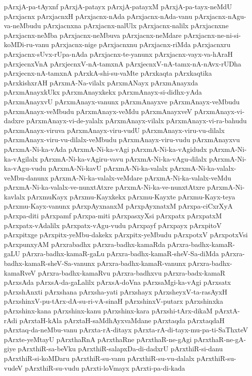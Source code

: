 {pArxjA-pa-tAyxnf
pArxjA-patayx
pArxjA-patayxM
pArxjA-pa-tayx-neMdU
pArxjacnx
pArxjacnxH
pArxjacnx-nAda
pArxjacnx-nAda-vanu
pArxjacnx-nAgu-va-neMbudu
pArxjacnxna
pArxjacnx-nalUlx
pArxjacnx-nalilx
pArxjacnxne
pArxjacnx-neMba
pArxjacnx-neMbuva
pArxjacnx-neMdare
pArxjacnx-ne-ni-si-koMDi-ru-vanu
pArxjacnx-nige
pArxjacnxnu
pArxjacnx-riMda
pArxjacnxru
pArxjacnx-sUvx-rUpa-nAda
pArxjacnx-te-yanunx
pArxjacnx-vayx-va-hAraH
pArxjecnxVnA
pArxjecnxV-nA-tamxnA
pArxjecnxV-nA-tamx-nA-nAvx-rUDha
pArxjecnx-nA-tamxnA
pArxkA-shi-su-vaMte
pArxkaqta
pArxkaqtika
pArxkishxrAH
pArxmA-Na-vilalx
pArxmANayx
pArxmAnayxda
pArxmAnayxkUkx
pArxmAnayxkekx
pArxmAnayx-si-didhx-yAda
pArxmAnayxvU
pArxmAnayx-vanunx
pArxmAnayxve
pArxmAnayx-veMbudu
pArxmAnayx-veMbudu
pArxmAnayx-veMdu
pArxmAnayxveV
pArxmAnayx-vi-dadxre
pArxmAnayx-vi-de-yalalx
pArxmAnayx-vilalx
pArxmAnayx-vi-ra-bahudu
pArxmAnayx-viruva
pArxmAnayx-viru-vudU
pArxmAnayx-viru-vu-dilalx
pArxmAnayx-viru-vu-dilalx-veMbudu
pArxmAnayx-viru-vudu
pArxmAnayxvu
pArxmA-Ni-ka-vAda
pArxmA-Ni-ka-vAgi
pArxmA-Ni-ka-vAgidudx
pArxmA-Ni-ka-vAgilalx
pArxmA-Ni-ka-vAgiru-vavu
pArxmA-Ni-ka-vAgu-dilalx
pArxmA-Ni-ka-vAgu-vudu
pArxmA-Ni-kavU
pArxmA-Ni-ka-valalx
pArxmA-Ni-ka-valalx-veMbu-danunx
pArxmA-Ni-ka-valalx-veMdare
pArxmA-Ni-ka-valalx-veMdu
pArxmA-Ni-ka-valalx-ve-nunxtAtxre
pArxmA-Ni-ka-ve-nunxtAtxre
pArxmA-Ni-kavlalx
pArxmuKayx
pArxmu-Kayxkekx
pArxmu-Kayxte
pArxmu-Kayx-teya
pArxmu-Kayx-vanunx
pArxpAyxnanxM
pArxpAyxnatxM
pArxpa-ciCxrXyA
pArxpa-diti
pArxpamf
pArxpa-miti
pArxpasxyXsi
pArxpatx
pArxpatxM
pArxpatx-vAdalilx
pArxpatx-vAgu-vudu
pArxpayf
pArxpayx
pArxpitoV
pArxpitxge
pArxpitx-yeMbu-dakekx
pArxpitx-yeMbudu
pArxpotxV
pArxpotxVsi
pArxpunxyAM
pArxrabadhx
pArxra-badhx-kamaRda
pArxra-badhx-kamaR-gaLU
pArxra-badhx-kamaR-gaLu
pArxra-badhx-kamaR-sheV-Sa-diMda
pArxra-badhx-kamaR-sheV-Sa-vanunx
pArxra-badhx-kamaR-vanunx
pArxra-badhx-kamaRveV
pArxra-badhx-kamaRvu
pArxra-badhxvu
pArxra-badx-kamaR
pArxsAda
pArxsA-da-gaLalilx
pArxsA-doVna
pArxsaMgi-ka-vAgi
pArxsatx
pArxshAnxti
pArxshana
pArxsha-yati
pArxshayx
pArxsheyxV-ta-rasAyxH
pArxshinxV-pu-tArx-dA-su-ri-vA-sinaH
pArxshinxV-putarx
pArxshinxka
pArxshinx-kana
pArxshinx-kanu
pArxshinx-kara
pArxshi-tArx-dikaM
pArxtA-rAdi
pArxtaH-kAla
pArxtaH-saMdhAyxvaMdane
pArxtaqda
pArxtaqdaH
pArxtaq-da-neMbu-vanu
pArxta-rA-ditayx
pArxta-rA-di-tayx-mu-pa-ti-SaThxteV
pArxte-yeMtayU
pArxthaRnA
pArxthaRne
pArxthaR-ne-gAgi
pArxthaR-ne-gA-giye
pArxthiR-sa-beVku
pArxthiR-salapxDa-di-dadxrU
pArxthiR-si-danu
pArxthiR-si-koMDaru
pArxthiR-su-vanu
pArxthiR-su-vu-dalalx
pArxthiR-su-vudeV
pArxthiR-su-vudu
pArxti-loVmayx
pArxti-pa-di-kada
}
